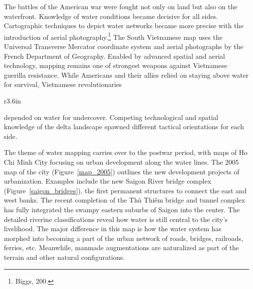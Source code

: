 The battles of the American war were fought not only on land but also on the waterfront. Knowledge of water conditions became decisive for all sides. Cartographic techniques to depict water networks became more precise with the introduction of aerial photography.\footnote{Biggs, 200.} The South Vietnamese map uses the Universal Transverse Mercator coordinate system and aerial photographs by the French Department of Geography. Enabled by advanced spatial and aerial technology, mapping remains one of strongest weapons against Vietnamese guerilla resistance. While Americans and their allies relied on staying above water for survival, Vietnamese revolutionaries 
\en
\begin{wrapfigure}{r}{3.6in}
\caption[Saigon River bridge complex]{Saigon River bridge complex (circled red)}
\label{saigon_bridges}
\end{wrapfigure}
\vi 
depended on water for undercover. Competing technological and spatial knowledge of the delta landscape spawned different tactical orientations for each side.

The theme of water mapping carries over to the postwar period, with maps of Ho Chi Minh City focusing on urban development along the water lines. The 2005 map of the city (Figure~\ref{map_2005}) outlines the new development projects of urbanization. Examples include the new Saigon River bridge complex (Figure~\ref{saigon_bridges}), the first permanent structures to connect the east and west banks. The recent completion of the \vi Thủ Thiêm bridge and tunnel complex has fully integrated the swampy eastern suburbs of Saigon into the center. The detailed riverine classifications reveal how water is still central to the city’s livelihood. The major difference in this map is how the water system has morphed into becoming a part of the urban network of roads, bridges, railroads, ferries, etc. Meanwhile, manmade augmentations are naturalized as part of the terrain and other natural configurations.

